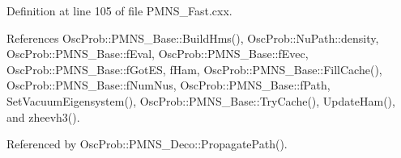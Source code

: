 Definition at line 105 of file P\+M\+N\+S\+\_\+\+Fast.\+cxx.



References Osc\+Prob\+::\+P\+M\+N\+S\+\_\+\+Base\+::\+Build\+Hms(), Osc\+Prob\+::\+Nu\+Path\+::density, Osc\+Prob\+::\+P\+M\+N\+S\+\_\+\+Base\+::f\+Eval, Osc\+Prob\+::\+P\+M\+N\+S\+\_\+\+Base\+::f\+Evec, Osc\+Prob\+::\+P\+M\+N\+S\+\_\+\+Base\+::f\+Got\+ES, f\+Ham, Osc\+Prob\+::\+P\+M\+N\+S\+\_\+\+Base\+::\+Fill\+Cache(), Osc\+Prob\+::\+P\+M\+N\+S\+\_\+\+Base\+::f\+Num\+Nus, Osc\+Prob\+::\+P\+M\+N\+S\+\_\+\+Base\+::f\+Path, Set\+Vacuum\+Eigensystem(), Osc\+Prob\+::\+P\+M\+N\+S\+\_\+\+Base\+::\+Try\+Cache(), Update\+Ham(), and zheevh3().



Referenced by Osc\+Prob\+::\+P\+M\+N\+S\+\_\+\+Deco\+::\+Propagate\+Path().



